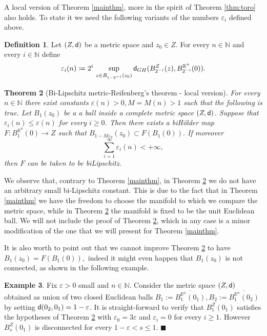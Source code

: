 \documentclass[11pt]{article}
\newcommand{\eps}{\varepsilon}
\newcommand{\rr}{\mathbb{R}}
\newcommand{\sfd}{{\sf d}}
\newcommand{\fr}{\penalty-20\null\hfill$\blacksquare$}
\theoremstyle{plain}
\newtheorem{theorem}{Theorem}[section]
\theoremstyle{definition}
\newtheorem{definition}[theorem]{Definition}
\newtheorem{example}[theorem]{Example}
\numberwithin{equation}{section}
\begin{document}
A local version of Theorem \ref{mainthm}, more in the spirit of Theorem \ref{thm:toro}  also holds.  To state it we need the following variants of the numbers $\eps_i$ defined above.

\begin{definition}\label{ghjonesloct}
	Let $(Z,\sfd)$ be a metric space and $z_0 \in Z$. For every   $n \in \mathbb{N}$ and every $i\in \mathbb{N}$ define 
	\begin{equation}\label{ghjonesloc}
		\eps_i(n)\coloneqq 2^i\, \sup_{z \in B_{1-2^{-i}}(z_0)} \sfd_{GH}(B^Z_{2^{-i}}(z),B^{\rr^n}_{2^{-i}}(0)).
	\end{equation}
\end{definition}


\begin{theorem}[Bi-Lipschitz metric-Reifenberg's theorem - local version]\label{localthm}
	For every $n \in \mathbb{N}$ there exist constants $\eps(n)>0, M=M(n)>1$ such that the following is true.  	Let $B_1(z_0)$ be a a ball inside a complete metric space $(Z,\sfd)$. Suppose that  $\eps_i(n) \le \eps(n)$ for every $i \ge 0$. Then there exists a   biH\"older map $F: B^{\rr^n}_1(0) \to Z $  such that $B_{1-M\eps_0}(z_0)\subset F(B_1(0)).$ 
 If moreover
	\begin{equation}\label{sumscales2}
		\sum_{i= 1}^\infty \eps_i(n) < +\infty,
	\end{equation}
	then $F$ can be taken to be biLipschitz.
\end{theorem}
We observe that, contrary to Theorem \ref{mainthm}, in Theorem \ref{localthm} we do not have an arbitrary small bi-Lipschitz constant. This is due to the fact that in Theorem \ref{mainthm} we have the freedom to choose the manifold to which we compare the metric space, while in Theorem \ref{localthm} the manifold is fixed to be the unit Euclidean ball. We will not include the proof of Theorem \ref{localthm}, which in any case is a minor modification of the one that we will present for Theorem \ref{mainthm}. 

It is also worth to point out that we cannot improve  Theorem \ref{localthm} to have $B_{1}(z_0)=F(B_1(0)),$ indeed it might even  happen  that $B_{1}(z_0)$ is not connected, as shown in the following example.



\begin{example}\label{twoballs}
	Fix $\eps>0$ small and $n\in \mathbb{N}$.
	Consider the metric space $(Z,\sfd)$ obtained as  union of two closed Euclidean balls $B_1:=\overline{B^{\rr^n}_{1}(0_1)},B_2:=\overline{B^{\rr^n}_{1}(0_2)}$ by setting $\sfd(0_2,0_1)=1-\eps$. It is straight-forward to verify that $B^Z_1(0_1)$ satisfies the hypotheses of Theorem \ref{localthm} with $\eps_0=3\eps$ and $\eps_i=0$ for every $i \ge 1.$ However $B^Z_s(0_1)$ is disconnected for every $1-\eps<s\le 1$. \fr
\end{example}
\end{document}
